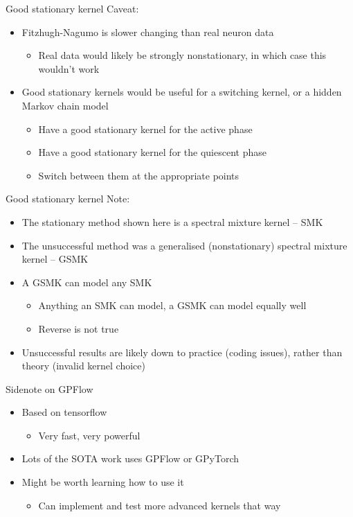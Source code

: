 \documentclass[presentation]{beamer}
\begin{document}
\begin{frame}[label={sec:org8dda83a}]{Good stationary kernel}
Caveat: 
\begin{itemize}
\item Fitzhugh-Nagumo is slower changing than real neuron data
\begin{itemize}
\item Real data would likely be strongly nonstationary, in which case this wouldn't work
\vfill
\end{itemize}
\item Good stationary kernels would be useful for a switching kernel, or a hidden Markov chain model
\begin{itemize}
\item Have a good stationary kernel for the active phase
\item Have a good stationary kernel for the quiescent phase
\item Switch between them at the appropriate points
\end{itemize}
\end{itemize}
\end{frame}

\begin{frame}[label={sec:orgc95310a}]{Good stationary kernel}
Note:
\begin{itemize}
\item The stationary method shown here is a spectral mixture kernel  -- SMK
\item The unsuccessful method was a generalised (nonstationary) spectral mixture kernel -- GSMK
\item A GSMK can model any SMK
\begin{itemize}
\item Anything an SMK can model, a GSMK can model equally well
\item Reverse is not true
\end{itemize}
\item Unsuccessful results are likely down to practice (coding issues), rather than theory (invalid kernel choice)
\end{itemize}
\end{frame}

\begin{frame}[label={sec:org8019c5b}]{Sidenote on GPFlow}
\begin{itemize}
\item Based on tensorflow
\begin{itemize}
\item Very fast, very powerful
\end{itemize}
\item Lots of the SOTA work uses GPFlow or GPyTorch
\item Might be worth learning how to use it
\begin{itemize}
\item Can implement and test more advanced kernels that way
\end{itemize}
\end{itemize}
\end{frame}
\end{document}
